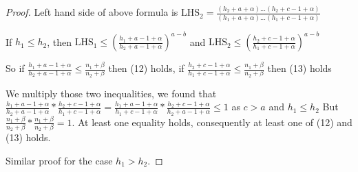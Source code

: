 \documentclass[aoas,preprint]{imsart}
\begin{document}
\begin{proof}
 Left hand side of above formula is $\text{LHS}_2 = \frac{(h_2 + a + \alpha)...(h_2 + c - 1 + \alpha)}{(h_1 + a + \alpha) ... (h_1 + c - 1 + \alpha)}$

If $h_1 \leq h_2$, then $\text{LHS}_1 \leq (\frac{h_1 + a - 1 + \alpha}{h_2 + a  - 1 + \alpha})^{a - b}$ and $\text{LHS}_2 \leq (\frac{h_2 + c - 1 + \alpha}{h_1 + c  - 1 + \alpha})^{a - b}$

So if $\frac{h_1 + a - 1 + \alpha}{h_2 + a  - 1 + \alpha} \leq \frac{n_1 + \beta}{n_2 + \beta} $ then (12) holds, if $\frac{h_2 + c - 1 + \alpha}{h_1 + c  - 1 + \alpha} \leq \frac{n_1 + \beta}{n_2 + \beta}$ then (13) holds

We multiply those two inequalities, we found that $\frac{h_1 + a - 1 + \alpha}{h_2 + a  - 1 + \alpha} * \frac{h_2 + c - 1 + \alpha}{h_1 + c  - 1 + \alpha} = \frac{h_1 + a - 1 + \alpha}{h_1 + c  - 1 + \alpha} * \frac{h_2 + c - 1 + \alpha}{h_2 + a  - 1 + \alpha} \leq 1$ as $c > a$ and $h_1 \leq h_2$ But $\frac{n_1 + \beta}{n_2 + \beta} * \frac{n_1 + \beta}{n_2 + \beta} = 1$. At least one equality holds, consequently at least one of (12) and (13) holds.

Similar proof for the case $h_1 > h_2$.




\end{proof}
\end{document}
